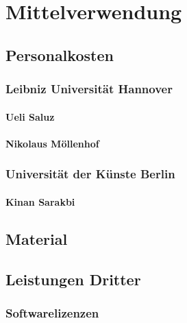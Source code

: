 \documentclass[type=zwischenbericht]{zukunftbau}
\begin{document}
\section{Mittelverwendung}

\subsection{Personalkosten}

\subsubsection{Leibniz Universität Hannover}
\begin{SemioNest}
\paragraph{Ueli Saluz}
\paragraph{Nikolaus Möllenhof}
\end{SemioNest}

\subsubsection{Universität der Künste Berlin}
\begin{SemioNest}
\paragraph{Kinan Sarakbi}
\end{SemioNest}

\subsection{Material}

\subsection{Leistungen Dritter}

\subsubsection{Softwarelizenzen}
\end{document}
